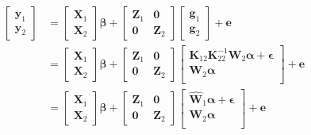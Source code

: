 \documentclass[12pt,titlepage]{article}
\begin{document}
\begin{align} \label{eq:entangled-augmented-single-step-model}
\begin{bmatrix}
  \mathbf{y}_1 \\
  \mathbf{y}_2
 \end{bmatrix}
& =
 \begin{bmatrix}
  \mathbf{X}_1 \\
  \mathbf{X}_2
 \end{bmatrix}
 \boldsymbol{\beta} +
 \begin{bmatrix}
  \mathbf{Z}_1 & \boldsymbol{0} \\
  \boldsymbol{0} & \mathbf{Z}_2
 \end{bmatrix}
\begin{bmatrix}
  \mathbf{g}_1 \\
  \mathbf{g}_2
 \end{bmatrix}
  + \mathbf{e} \\
    & =
 \begin{bmatrix}
 \mathbf{X}_1 \\
 \mathbf{X}_2
 \end{bmatrix}
 \boldsymbol{\beta} +
 \begin{bmatrix}
  \mathbf{Z}_1 & \boldsymbol{0} \\
  \boldsymbol{0} & \mathbf{Z}_2
 \end{bmatrix}
\begin{bmatrix}
  \mathbf{K}_{12}\mathbf{K}^{-1}_{22}\mathbf{W}_2
  \boldsymbol{\alpha} + \boldsymbol{\epsilon}  \\
  \mathbf{W}_2\boldsymbol{\alpha} \\
 \end{bmatrix}
  + \mathbf{e} \\
    & =
 \begin{bmatrix}
  \mathbf{X}_1 \\
  \mathbf{X}_2
 \end{bmatrix}
 \boldsymbol{\beta} +
 \begin{bmatrix}
  \mathbf{Z}_1 & \boldsymbol{0} \\
  \boldsymbol{0} & \mathbf{Z}_2
 \end{bmatrix}
\begin{bmatrix}
  \mathbf{\hat{W}}_{1}\boldsymbol{\alpha} + \boldsymbol{\epsilon} \\
  \mathbf{W}_2\boldsymbol{\alpha} \\
 \end{bmatrix}
  + \mathbf{e} \\
\end{align}
\end{document}
